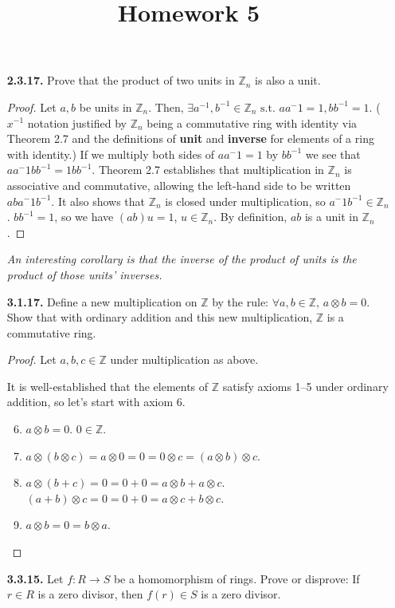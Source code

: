 \documentclass[12pt]{article}
\title{Homework 5}
\newcommand{\zee}{\mathbb{Z}}
\newcommand{\such}{\text{ s.t. }}
\begin{document}
\begin{itemize}
\item[\textbf{ 2.3.17.}] Prove that the product of two units in $\zee_n$ is also a unit.

\begin{proof}
  Let $a, b$ be units in $\zee_n$.
  Then, $\exists a^{-1}, b^{-1} \in \zee_n \such a a{^-1} = 1, b b^{-1} = 1$.
  ($x^{-1}$ notation justified by $\zee_n$ being a commutative ring with identity via Theorem 2.7 and the definitions of \textbf{unit} and \textbf{inverse} for elements of a ring with identity.)
  If we multiply both sides of $a a{^-1} = 1$ by $b b^{-1}$ we see that $a a{^-1} b b^{-1} = 1 b b^{-1}$.
  Theorem 2.7 establishes that multiplication in $\zee_n$ is associative and commutative, allowing the left-hand side to be written $a b a{^-1} b^{-1}$.
  It also shows that $\zee_n$ is closed under multiplication, so $a{^-1} b^{-1} \in \zee_n$.
  $b b^{-1} = 1$, so we have $(ab)u = 1$, $u \in \zee_n$.
  By definition, $ab$ is a unit in $\zee_n$.
\end{proof}

\textit{An interesting corollary is that the inverse of the product of units is the product of those units' inverses.}

\item[\textbf{ 3.1.17.}] Define a new multiplication on $\zee$ by the rule: $\forall a,b\in\zee$, $a\otimes b=0$. Show that with ordinary addition and this new multiplication, $\zee$ is a commutative ring.

\begin{proof}
  Let $a, b, c \in \zee$ under multiplication as above.
  \par
  It is well-established that the elements of $\zee$ satisfy axioms 1--5 under ordinary addition, so let's start with axiom 6.
  \begin{enumerate}
    \setcounter{enumi}{5}
    \item $a\otimes b = 0$. $0 \in \zee$.
    \item $a\otimes(b\otimes c) = a\otimes 0 = 0 = 0 \otimes c = (a\otimes b) \otimes c$.
    \item $a\otimes (b+c) = 0 = 0 + 0 = a\otimes b + a \otimes c$. $(a+b)\otimes c = 0 = 0 + 0 = a \otimes c + b \otimes c$.
    \item $a \otimes b = 0 = b \otimes a$.
  \end{enumerate}
\end{proof}

\item[\textbf{3.3.15.}] Let $f:R\to S$ be a homomorphism of rings. Prove or disprove: If $r\in R$ is a zero divisor, then $f(r)\in S$ is a zero divisor.


\end{itemize}
\end{document}

